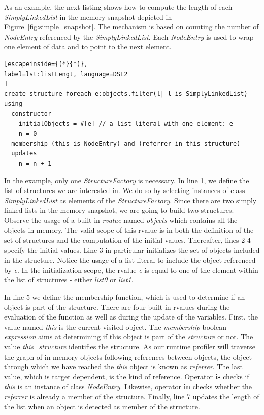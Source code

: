 As an example, the next listing shows how to compute the length of each \textit{SimplyLinkedList} in the memory snapshot depicted in Figure~\ref{fig:simple_snapshot}.
The mechanism is based on counting the number of \textit{NodeEntry} referenced by the \textit{SimplyLinkedList}.
Each \textit{NodeEntry} is used to wrap one element of data and to point to the next element.

\begin{lstlisting}[escapeinside={(*}{*)}, 
label=lst:listLengt, language=DSL2
]
create structure foreach e:objects.filter(l| l is SimplyLinkedList) using
  constructor
    initialObjects = #[e] // a list literal with one element: e
    n = 0
  membership (this is NodeEntry) and (referrer in this_structure)
  updates 
    n = n + 1
\end{lstlisting}

In the example, only one \textit{StructureFactory} is necessary.
In line 1, we define the list of structures we are interested in.
We do so by selecting instances of class \textit{SimplyLinkedList} as elements of the \textit{StructureFactory}.
Since there are two simply linked lists in the memory snapshot, we are going to build two structures.
Observe the usage of a built-in \textit{rvalue} named \textit{objects} which contains all the objects in memory.
The valid scope of this rvalue is in both the definition of the set of structures and the computation of the initial values.
Thereafter, lines 2-4 specify the initial values.
Line 3 in particular initializes the set of objects included in the structure.
Notice the usage of a list literal to include the object referenced by \textit{e}.
In the initialization scope, the rvalue \textit{e} is equal to one of the element within the list of structures - either \textit{list0} or \textit{list1}.

In line 5 we define the membership function, which is used to determine if an object is part of the structure.
There are four built-in rvalues during the evaluation of the function as well as during the update of the variables.
First, the value named \textit{this} is the current visited object. 
The \textit{membership} boolean \textit{expression} aims at determining if this object is part of the \textit{structure} or not. 
The value \textit{this\_structure} identifies the structure.
As our runtime profiler will traverse the graph of in memory objects following references between objects, the object through which we have reached the \textit{this} object is known as \textit{referrer}.
The last value, which is target dependent, is the kind of reference.
Operator \textbf{is} checks if \textit{this} is an instance of class \textit{NodeEntry}.
Likewise, operator \textbf{in} checks whether the \textit{referrer} is already a member of the structure.
Finally, line 7 updates the length of the list when an object is detected as member of the structure.

